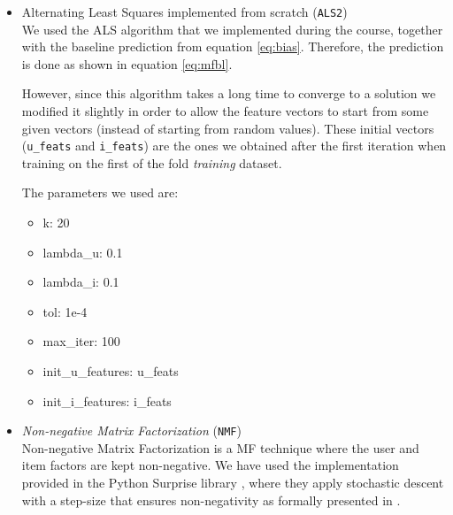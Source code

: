 \documentclass[10pt,conference,compsocconf]{IEEEtran}
\begin{document}
\begin{itemize}
        \item Alternating Least Squares implemented from scratch (\texttt{ALS2})\\
        We used the ALS algorithm that we implemented during the course, together with the baseline prediction from equation \ref{eq:bias}. Therefore, the prediction is done as shown in equation \ref{eq:mfbl}.

        However, since this algorithm takes a long time to converge to a solution we modified it slightly in order to allow the feature vectors to start from some given vectors (instead of starting from random values). These initial vectors (\texttt{u\_feats} and \texttt{i\_feats}) are the ones we obtained after the first iteration when training on the first of the fold \emph{training} dataset.

        The parameters we used are:
        \begin{itemize}
          \item k: 20
          \item lambda\_u: 0.1
          \item lambda\_i: 0.1
          \item tol: 1e-4
          \item max\_iter: 100
          \item init\_u\_features: u\_feats
          \item init\_i\_features: i\_feats
        \end{itemize}
        \item \emph{Non-negative Matrix Factorization} (\texttt{NMF})\\
          Non-negative Matrix Factorization is a MF technique where the user and item factors are kept non-negative. We have used the implementation provided in the Python Surprise library \cite{surprise}, where they apply stochastic descent with a step-size that ensures non-negativity as formally presented in \cite{zhang2006learning, luo2014efficient}.
      \end{itemize}
\end{document}
